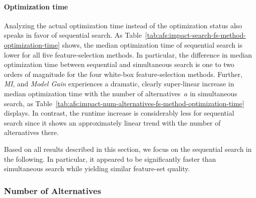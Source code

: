 \documentclass{article}
\theoremstyle{definition}
\begin{document}
\paragraph{Optimization time}

Analyzing the actual optimization time instead of the optimization status also speaks in favor of sequential search.
As Table~\ref{tab:afs:impact-search-fs-method-optimization-time} shows, the median optimization time of sequential search is lower for all five feature-selection methods.
In particular, the difference in median optimization time between sequential and simultaneous search is one to two orders of magnitude for the four white-box feature-selection methods.
Further, \emph{MI}, and \emph{Model Gain} experiences a dramatic, clearly super-linear increase in median optimization time with the number of alternatives~$a$ in simultaneous search, as Table~\ref{tab:afs:impact-num-alternatives-fs-method-optimization-time} displays.
In contrast, the runtime increase is considerably less for sequential search since it shows an approximately linear trend with the number of alternatives there.

Based on all results described in this section, we focus on the sequential search in the following.
In particular, it appeared to be significantly faster than simultaneous search while yielding similar feature-set quality.

\subsubsection{Number of Alternatives}
\label{sec:afs:evaluation:search:num-alternatives}
\end{document}
